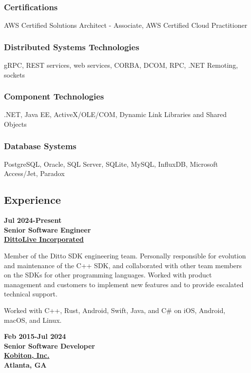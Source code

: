 \subsubsection{Certifications}\label{certifications}

AWS Certified Solutions Architect - Associate, AWS Certified Cloud
Practitioner

\subsubsection{Distributed Systems
Technologies}\label{distributed-systems-technologies}

gRPC, REST services, web services, CORBA, DCOM, RPC, .NET Remoting,
sockets

\subsubsection{Component Technologies}\label{component-technologies}

.NET, Java EE, ActiveX/OLE/COM, Dynamic Link Libraries and Shared
Objects

\subsubsection{Database Systems}\label{database-systems}

PostgreSQL, Oracle, SQL Server, SQLite, MySQL, InfluxDB, Microsoft
Access/Jet, Paradox

\subsection{Experience}\label{experience}

\textbf{Jul 2024-Present\\
Senior Software Engineer\\
\href{https://ditto.live}{DittoLive Incorporated}}

Member of the Ditto SDK engineering team. Personally responsible for
evolution and maintenance of the C++ SDK, and collaborated with other
team members on the SDKs for other programming languages. Worked with
product management and customers to implement new features and to
provide escalated technical support.

Worked with C++, Rust, Android, Swift, Java, and C\# on iOS, Android,
macOS, and Linux.

\textbf{Feb 2015-Jul 2024\\
Senior Software Developer\\
\href{https://kobiton.com}{Kobiton, Inc.}\\
Atlanta, GA}

